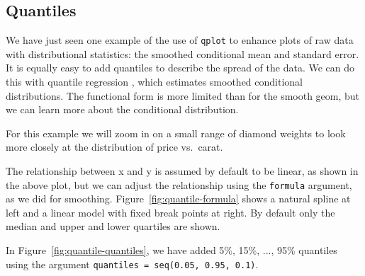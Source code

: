 \begin{itemize}
    


\end{itemize}

\subsection{Quantiles}
\label{sub:quantile}

We have just seen one example of the use of {\tt qplot} to enhance plots of raw data with distributional statistics: the smoothed conditional mean and standard error.  It is equally easy to add quantiles to describe the spread of the data.  We can do this with quantile regression \citep{koenker:2005}, which estimates smoothed conditional distributions.  The functional form is more limited than for the smooth geom, but we can learn more about the conditional distribution.

For this example we will zoom in on a small range of diamond weights to look more closely at the distribution of price vs.\ carat.

% 


The relationship between x and y is assumed by default to be linear, as shown in the above plot, but we can adjust the relationship using the {\tt formula} argument, as we did for smoothing. Figure~\ref{fig:quantile-formula} shows a natural spline at left and a linear model with fixed break points at right.  By default only the median and upper and lower quartiles are shown.

In Figure~\ref{fig:quantile-quantiles}, we have added 5\%, 15\%, ..., 95\% quantiles using the argument {\tt quantiles = seq(0.05, 0.95, 0.1)}.

% 



